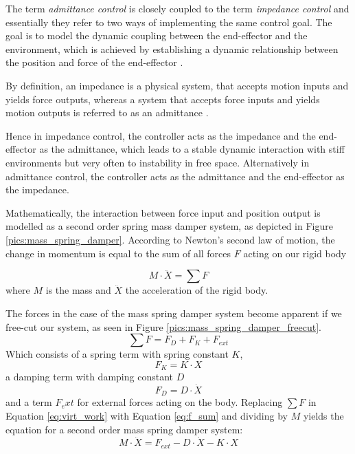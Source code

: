 The term \emph{admittance control} is closely coupled to the term \emph{impedance control} and essentially they refer to two ways of implementing the same control goal. The goal is to model the dynamic coupling between the end-effector and the environment, which is achieved by establishing a dynamic relationship between the position and force of the end-effector \citep{hogan1985impedance}.

By definition, an impedance is a physical system, that accepts motion inputs and yields force outputs, whereas a system that accepts force inputs and yields motion outputs is referred to as an admittance \citep{ott2010unified}.

Hence in impedance control, the controller acts as the impedance and the end-effector as the admittance, which leads to a stable dynamic interaction with stiff environments but very often to instability in free space. Alternatively in admittance control, the controller acts as the admittance and the end-effector as the impedance.

Mathematically, the interaction between force input and position output is modelled as a second order spring mass damper system, as depicted in Figure \ref{pics:mass_spring_damper}. According to Newton's second law of motion, the change in momentum is equal to the sum of all forces $F$ acting on our rigid body

\begin{equation}
M \cdot \ddot{X} = \sum F
	\label{eq:virt_work}
\end{equation}
where $M$ is the mass and $\ddot{X}$ the acceleration of the rigid body.

The forces in the case of the mass spring damper system become apparent if we free-cut our system, as  seen in Figure \ref{pics:mass_spring_damper_freecut}.
\begin{equation}
\sum F = F_D + F_K + F_{ext}
	\label{eq:f_sum}
\end{equation}
Which consists of a spring term with spring constant $K$,
\begin{equation}
F_K = K \cdot X
\end{equation}
 a damping term with damping constant $D$
\begin{equation}
F_D = D \cdot \dot{X}
\end{equation}
 and a term $F_ext$ for external forces acting on the body. Replacing $\sum F$ in Equation \ref{eq:virt_work} with Equation \ref{eq:f_sum} and dividing by $M$ yields the equation for a second order mass spring damper system:
\begin{equation}
M \cdot \ddot{X} = F_{ext} -D \cdot \dot{X} -K \cdot X
	\label{eq:mass_spring_damper_sys}
\end{equation}

